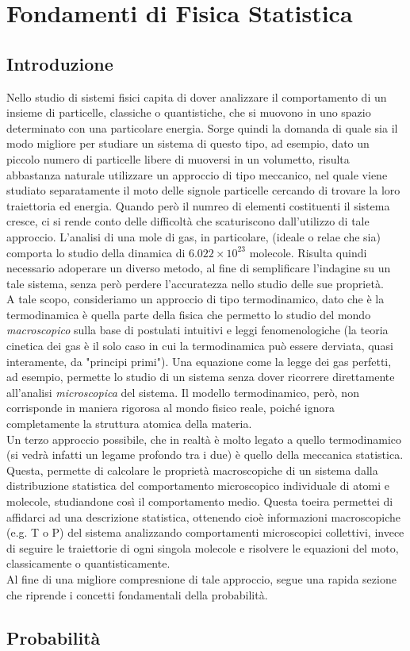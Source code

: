 \chapter{Fondamenti di Fisica Statistica}
\section{Introduzione}

Nello studio di sistemi fisici capita di dover analizzare il comportamento di un insieme di particelle, classiche o quantistiche, che si muovono in uno spazio determinato con una particolare energia. Sorge quindi la domanda di quale sia il modo migliore per studiare un sistema di questo tipo, ad esempio, dato un piccolo numero di particelle libere di muoversi in un volumetto, risulta abbastanza naturale utilizzare un approccio di tipo meccanico, nel quale viene studiato separatamente il moto delle signole particelle cercando di trovare la loro traiettoria ed energia. Quando però il numreo di elementi costituenti il sistema cresce, ci si rende conto delle difficoltà che scaturiscono dall'utilizzo di tale approccio. L'analisi di una mole di gas, in particolare, (ideale o relae che sia) comporta lo studio della dinamica di $6.022\times 10^{23}$ molecole. Risulta quindi necessario adoperare un diverso metodo, al fine di semplificare l'indagine su un tale sistema, senza però perdere l'accuratezza nello studio delle sue proprietà.
\\
A tale scopo, consideriamo un approccio di tipo termodinamico, dato che è la termodinamica è quella parte della fisica che permetto lo studio del mondo \textit{macroscopico} sulla base di postulati intuitivi e leggi fenomenologiche (la teoria cinetica dei gas è il solo caso in cui la termodinamica può essere derviata, quasi interamente, da "principi primi"). Una equazione come la legge dei gas perfetti, ad esempio, permette lo studio di un sistema senza dover ricorrere direttamente all'analisi \textit{microscopica} del sistema. Il modello termodinamico, però, non corrisponde in maniera rigorosa al mondo fisico reale, poiché ignora completamente la struttura atomica della materia.
\\
Un terzo approccio possibile, che in realtà è molto legato a quello termodinamico (si vedrà infatti un legame profondo tra i due) è quello della meccanica statistica. Questa, permette di calcolare le proprietà macroscopiche di un sistema dalla distribuzione statistica del comportamento microscopico individuale di atomi e molecole, studiandone così il comportamento medio. Questa toeira permettei di affidarci ad una descrizione statistica, ottenendo cioè informazioni macroscopiche (e.g. T o P) del sistema analizzando comportamenti microscopici collettivi, invece di seguire le traiettorie di ogni singola molecole e risolvere le equazioni del moto, classicamente o quantisticamente.
\\
Al fine di una migliore compresnione di tale approccio, segue una rapida sezione che riprende i concetti fondamentali della probabilità.
\section{Probabilità}
